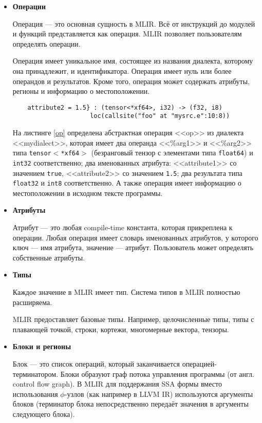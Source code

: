 \begin{itemize}
	\item
	      \textbf{Операции}

	      Операция --- это основная сущность в MLIR. Всё от инструкций до модулей и функций представляется как операция. MLIR позволяет пользователям определять операции.

	      Операция имеет уникальное имя, состоящее из названия диалекта, которому она принадлежит, и идентификатора. Операция имеет нуль или более операндов и результатов. Кроме того, операция может содержать атрибуты, регионы и информацию о местоположении.

	      \begin{lstlisting}[caption={Пример операции.}, frame=single, label={op}]
%res:2 = "mydialect.op"(%arg1, %arg2) { attribute1 = true,
    attribute2 = 1.5} : (tensor<*xf64>, i32) -> (f32, i8)
                     loc(callsite("foo" at "mysrc.e":10:8))
		  \end{lstlisting}

	      На листинге \ref{op} определена абстрактная операция <<op>> из диалекта <<mydialect>>, которая имеет два операнда <<\%arg1>> и <<\%arg2>> типа \texttt{tensor$<$*xf64$>$} (безранговый тензор с элементами типа \texttt{float64}) и \texttt{int32} соответственно; два именованных атрибута: <<attribute1>> со значением \texttt{true}, <<attribute2>> со значением \texttt{1.5}; два результата типа \texttt{float32} и \texttt{int8} соответственно. А также операция имеет информацию о местоположении в исходном тексте программы.

	\item
	      \textbf{Атрибуты}

	      Атрибут --- это любая compile-time константа, которая прикреплена к операции. Любая операция имеет словарь именованных атрибутов, у которого ключ --- имя атрибута, значение --- атрибут. Пользователь может определять собственные атрибуты.

	\item
	      \textbf{Типы}

	      Каждое значение в MLIR имеет тип. Система типов в MLIR полностью расширяема.

	      MLIR предоставляет базовые типы. Например, целочисленные типы, типы с плавающей точкой, строки, кортежи, многомерные вектора, тензоры.

	\item
	      \textbf{Блоки и регионы}

	      Блок --- это список операций, который заканчивается операцией-терминатором. Блоки образуют граф потока управления программы (от англ. control flow graph). В MLIR для поддержания SSA формы вместо использования $\phi$-узлов (как например в LLVM IR) используются аргументы блоков (терминатор блока непосредственно передаёт значения в аргументы следующего блока).


\end{itemize}
